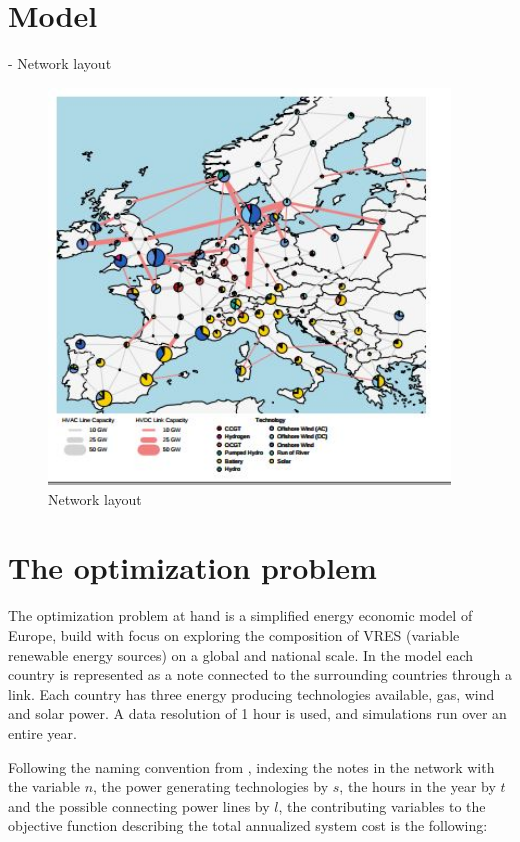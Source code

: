 
\section{Model}
	
	- Network layout 
	
\begin{figure}[H]\centering
	\includegraphics[width=0.95\textwidth]{./Images/network_layout}
	\caption{Network layout}
	\label{fig:network_lay}
\end{figure}
	
\section{The optimization problem}\label{sec:OptimizationProblem}


The optimization problem at hand is a simplified energy economic model of Europe, build with focus on exploring the composition of VRES (variable renewable energy sources) on a global and national scale. In the model each country is represented as a note connected to the surrounding countries through a link. Each country has three energy producing technologies available, gas, wind and solar power. A data resolution of 1 hour is used, and simulations run over an entire year. 

Following the naming convention from \cite{PyPSA_euro_30_model}, indexing the notes in the network with the variable $n$, the power generating technologies by $s$, the hours in the year by $t$ and the possible connecting power lines by $l$, the contributing variables to the objective function describing the total annualized system cost is the following: 

